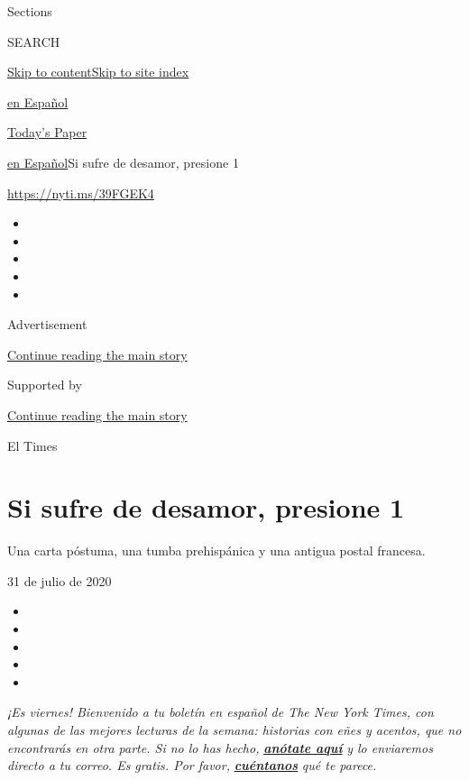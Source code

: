 Sections

SEARCH

\protect\hyperlink{site-content}{Skip to
content}\protect\hyperlink{site-index}{Skip to site index}

\href{https://www.nytimes.com/es/}{en Español}

\href{https://myaccount.nytimes.com/auth/login?response_type=cookie\&client_id=vi}{}

\href{https://www.nytimes.com/section/todayspaper}{Today's Paper}

\href{/es/}{en Español}\textbar{}Si sufre de desamor, presione 1

\url{https://nyti.ms/39FGEK4}

\begin{itemize}
\item
\item
\item
\item
\item
\end{itemize}

Advertisement

\protect\hyperlink{after-top}{Continue reading the main story}

Supported by

\protect\hyperlink{after-sponsor}{Continue reading the main story}

El Times

\hypertarget{si-sufre-de-desamor-presione-1}{%
\section{Si sufre de desamor, presione
1}\label{si-sufre-de-desamor-presione-1}}

Una carta póstuma, una tumba prehispánica y una antigua postal francesa.

31 de julio de 2020

\begin{itemize}
\item
\item
\item
\item
\item
\end{itemize}

\emph{¡Es viernes! Bienvenido a tu boletín en español de The New York
Times, con algunas de las mejores lecturas de la semana: historias con
eñes y acentos, que no encontrarás en otra parte. Si no lo has hecho,}
\textbf{\href{https://www.nytimes.com/newsletters/el-times}{\emph{anótate
aquí}}} \emph{y lo enviaremos directo a tu correo. Es gratis. Por
favor,} \textbf{\href{mailto:comentarios@nytimes.com}{\emph{cuéntanos}}}
\emph{qué te parece.}

